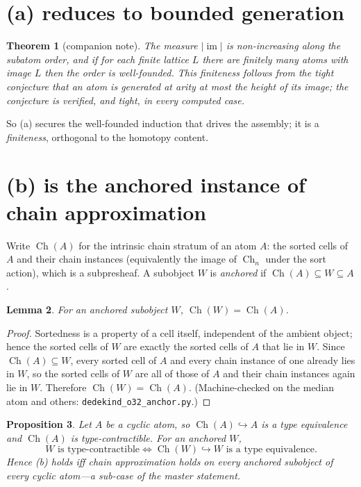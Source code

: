 \documentclass[11pt]{amsart}
\theoremstyle{plain}
\newtheorem{thm}{Theorem}[section]
\newtheorem{lem}[thm]{Lemma}
\newtheorem{prop}[thm]{Proposition}
\theoremstyle{definition}
\newcommand{\Ch}{\operatorname{Ch}}
\begin{document}
\section{(a) reduces to bounded generation}

\begin{thm}[companion note]
  The measure $|{\operatorname{im}}|$ is non-increasing along the subatom
  order, and if for each finite lattice $L$ there are finitely many atoms
  with image $L$ then the order is well-founded.  This finiteness follows
  from the tight conjecture that an atom is generated at arity at most the
  height of its image; the conjecture is verified, and tight, in every
  computed case.
\end{thm}

So (a) secures the well-founded induction that drives the assembly; it is
a \emph{finiteness}, orthogonal to the homotopy content.

\section{(b) is the anchored instance of chain approximation}

Write $\Ch(A)$ for the intrinsic chain stratum of an atom $A$: the
sorted cells of $A$ and their chain instances (equivalently the image of
$\Ch_n$ under the sort action), which is a subpresheaf.  A subobject $W$
is \emph{anchored} if $\Ch(A)\subseteq W\subseteq A$.

\begin{lem}\label{lem:chw}
  For an anchored subobject $W$, $\Ch(W)=\Ch(A)$.
\end{lem}

\begin{proof}
  Sortedness is a property of a cell itself, independent of the ambient
  object; hence the sorted cells of $W$ are exactly the sorted cells of
  $A$ that lie in $W$.  Since $\Ch(A)\subseteq W$, every sorted cell of
  $A$ and every chain instance of one already lies in $W$, so the sorted
  cells of $W$ are all of those of $A$ and their chain instances again
  lie in $W$.  Therefore $\Ch(W)=\Ch(A)$.  (Machine-checked on the
  median atom and others: \texttt{dedekind\_o32\_anchor.py}.)
\end{proof}

\begin{prop}\label{prop:bequiv}
  Let $A$ be a cyclic atom, so $\Ch(A)\hookrightarrow A$ is a type
  equivalence and $\Ch(A)$ is type-contractible.  For an anchored $W$,
  \[
    W \text{ is type-contractible}
    \iff
    \Ch(W)\hookrightarrow W \text{ is a type equivalence.}
  \]
  Hence (b) holds iff chain approximation holds on every anchored
  subobject of every cyclic atom---a sub-case of the master statement.
\end{prop}
\end{document}
